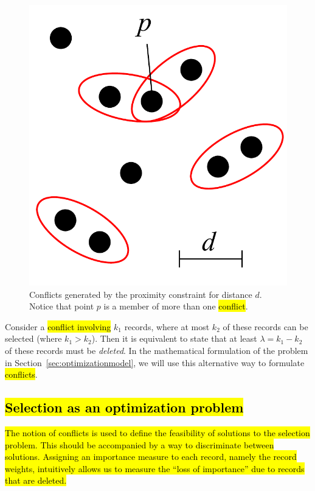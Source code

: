\begin{figure}[htbp]
\begin{center}
\includegraphics[scale=.3]{figs/cvl_proximity_conflicts.pdf}
\caption{Conflicts generated by the proximity constraint for distance $d$. Notice that point $p$ is a member of more than one \hl{conflict}.}
\label{fig:proximity:conflict}
\end{center}
\vspace*{-4ex}
\end{figure}

Consider a \hl{conflict involving} $k_1$ records, where at most $k_2$ of these records can be selected (where $k_1 > k_2$). Then it is equivalent to state that at least $\lambda = k_1 - k_2$ of these records must be \emph{deleted}. In the mathematical formulation of the problem in Section~\ref{sec:optimizationmodel}, we will use this alternative way to formulate \hl{conflicts}.

\subsection{\hl{Selection as an optimization problem}}
\label{sec:filtering}
\hl{The notion of conflicts is used to define the feasibility of solutions to the selection problem. This should be accompanied by a way to discriminate between solutions. Assigning an importance measure to each record, namely the record weights, intuitively allows us to measure the ``loss of importance'' due to records that are deleted.} 

